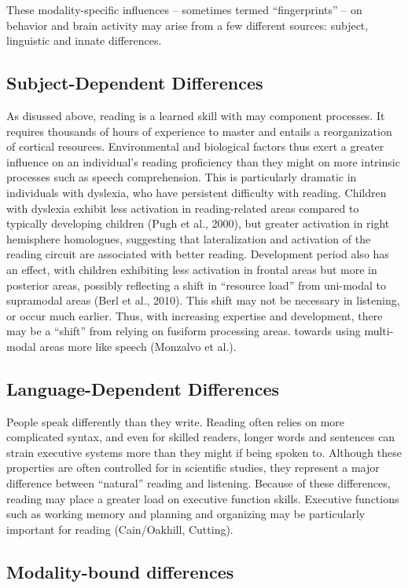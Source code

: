 These modality-specific influences – sometimes termed “fingerprints” – on behavior and brain activity may arise from a few different sources: subject, linguistic and innate differences. 

\subsection{Subject-Dependent Differences}
As disussed above, reading is a learned skill with may component processes. It requires thousands of hours of experience to master and entails a reorganization of cortical resources. Environmental and biological factors thus exert a greater influence on an individual’s reading proficiency than they might on more intrinsic processes such as speech comprehension. This is particularly dramatic in individuals with dyslexia, who have persistent difficulty with reading. Children with dyslexia exhibit less activation in reading-related areas compared to typically developing children (Pugh et al., 2000), but greater activation in right hemisphere homologues, suggesting that lateralization and activation of the reading circuit are associated with better reading. Development period also has an effect, with children exhibiting less activation in frontal areas but more in posterior areas, possibly reflecting a shift in “resource load” from uni-modal to supramodal areas (Berl et al., 2010). This shift may not be necessary in listening, or occur much earlier. Thus, with increasing expertise and development, there may be a “shift” from relying on fusiform processing areas. towards using multi-modal areas more like speech (Monzalvo et al.). 

\subsection{Language-Dependent Differences}
People speak differently than they write. Reading often relies on more complicated syntax, and even for skilled readers, longer words and sentences can strain executive systems more than they might if being spoken to. Although these properties are often controlled for in scientific studies, they represent a major difference between “natural” reading and listening. Because of these differences, reading may place a greater load on executive function skills. Executive functions such as working memory and planning and organizing may be particularly important for reading (Cain/Oakhill, Cutting).  

\subsection{Modality-bound differences}

